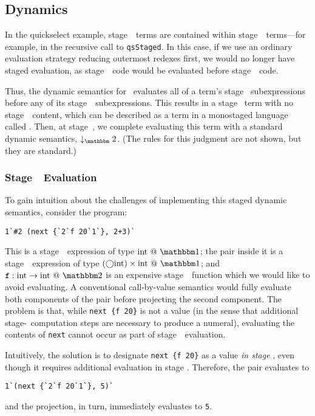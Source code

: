 \subsection{Dynamics}
\label{sec:stagedsemantics}

In the quickselect example, stage~\bbone\ terms are contained within
stage~\bbtwo\ terms---for example, in the recursive call to {\tt qsStaged}. In
this case, if we use an ordinary evaluation strategy reducing outermost redexes
first, we would no longer have staged evaluation, as stage~\bbtwo\ code would
be evaluated before stage~\bbone\ code. 

Thus, the dynamic semantics for \lang\ evaluates all of a term's stage \bbone\
subexpressions before any of its stage~\bbtwo\ subexpressions. This results in
a stage \bbtwo\ term with no stage~\bbone\ content, 
which can be described as a term in a monostaged language called \langTwo. 
Then, at stage~\bbtwo, we complete
evaluating this term with a standard dynamic semantics, $\tworedsym$. (The
rules for this judgment are not shown, but they are standard.)

\subsubsection{Stage~\bbone\ Evaluation}

To gain intuition about the challenges of implementing this staged dynamic
semantics, consider the program:
\begin{lstlisting}
1`#2 (next {`2`f 20`1`}, 2+3)`
\end{lstlisting}
This is a stage~\bbone\ expression of type $\rmint~@~\bbone$; the pair inside it is a
stage~\bbone\ expression of type $(\fut\rmint)\times\rmint~@~\bbone$; and ${\tt f} :
\rmint \to \rmint~@~\bbtwo$ is an expensive stage~\bbtwo\ function which we would like
to avoid evaluating. A conventional call-by-value semantics would fully
evaluate both components of the pair before projecting the second component.
The problem is that, while \verb|next {f 20}| is not a value (in the sense that
additional stage-\bbtwo\ computation steps are necessary to produce a numeral),
evaluating the contents of \verb|next| cannot occur as part of stage~\bbone\
evaluation.

Intuitively, the solution is to designate \verb|next {f 20}| as a value
\emph{in stage \bbone}, even though it requires additional evaluation in stage
\bbtwo. Therefore, the pair evaluates to
\begin{lstlisting}
1`(next {`2`f 20`1`}, 5)`
\end{lstlisting}
and the projection, in turn, immediately evaluates to \verb|5|.

